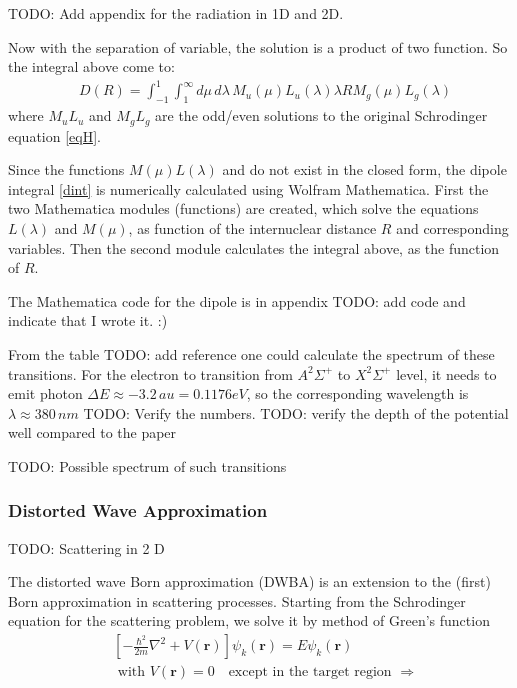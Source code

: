 TODO: Add appendix for the radiation in 1D and 2D.

Now with the separation of variable, the solution is a product of two function. So the integral above come to:
\begin{equation}\label{dint}
\begin{split}
& D(R) = \int_{-1}^{1}{\int_{1}^{\infty}{ d\mu\, d\lambda\, M_u(\mu)L_u(\lambda)\lambda R M_g(\mu)L_g(\lambda) }}
\end{split}
\end{equation}
where $ M_uL_u $ and $ M_gL_g $ are the odd/even solutions to the original Schrodinger equation \eqref{eqH}.

Since the functions $ M(\mu)L(\lambda) $ and  do not exist in the closed form, the dipole integral \eqref{dint}  is numerically calculated using Wolfram Mathematica.  First the two Mathematica modules (functions) are created, which solve the equations $ L(\lambda) $ and $ M(\mu) $, as function of the internuclear distance $ R $ and corresponding variables. Then the second module calculates the integral above,  as the function of $ R $.

The Mathematica code for the dipole is in appendix TODO: add code and indicate that I wrote it. :)

From the table TODO: add reference one could calculate the spectrum of these transitions.  For the electron to transition from $ A^2\Sigma^{+} $ to $ X^2\Sigma^{+} $ level, it needs to emit photon $ \Delta E \approx  -3.2\,au = 0.1176 eV $, so the corresponding wavelength is $ \lambda \approx   380\,nm $  TODO: Verify the numbers.
TODO: verify the depth of the potential well compared to the paper \cite{H2Plus2d1}

TODO: Possible spectrum of such transitions

\subsubsection{Distorted Wave Approximation}


TODO: Scattering in 2 D

The distorted wave Born approximation (DWBA) is an extension to the (first) Born approximation in scattering processes. Starting from the Schrodinger equation for the scattering problem, we solve it by method of Green's function
\begin{equation}
\begin{split}
& \left[-\frac{\hbar^2}{2m}\nabla^2 + V(\mathbf{r})\right]\psi_k(\mathbf{r}) = E \psi_k(\mathbf{r}) \\[.8em]
& \text{ with } V(\mathbf{r}) = 0 \,\,\,\,\text{ except in the target region }  \Longrightarrow
\end{split}
\end{equation}

